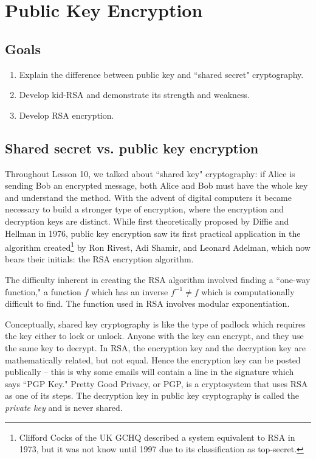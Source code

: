 \documentclass[m3380-lec-main.tex]{subfiles}
\begin{document}
\chapter{Public Key Encryption}

\section*{Goals}
\begin{enumerate}[1.~]\setlength{\itemsep}{0pt}
\item Explain the difference between public key and ``shared secret" cryptography.
\item Develop kid-RSA and demonstrate its strength and weakness.
\item Develop RSA encryption.
\end{enumerate}

\section{Shared secret vs. public key encryption}
Throughout Lesson 10, we talked about ``shared key" cryptography: if Alice is sending Bob an encrypted message, both Alice and Bob must have the whole key and understand the method. With the advent of digital computers it became necessary to build a stronger type of encryption, where the encryption and decryption keys are distinct. While first theoretically proposed by Diffie and Hellman in 1976, public key encryption saw its first practical application in the algorithm created\footnote{Clifford Cocks of the UK GCHQ described a system equivalent to RSA in 1973, but it was not know until 1997 due to its classification as top-secret.} by Ron Rivest, Adi Shamir, and Leonard Adelman, which now bears their initials: the RSA encryption algorithm.

The difficulty inherent in creating the RSA algorithm involved finding a ``one-way function," a function $f$ which has an inverse $f^{-1}\neq f$ which is computationally difficult to find. The function used in RSA involves modular exponentiation.

Conceptually, shared key cryptography is like the type of padlock which requires the key either to lock or unlock. Anyone with the key can encrypt, and they use the same key to decrypt. In RSA, the encryption key and the decryption key are mathematically related, but not equal. Hence the encryption key can be posted publically -- this is why some emails will contain a line in the signature which says ``PGP Key." Pretty Good Privacy, or PGP, is a cryptosystem that uses RSA as one of its steps. The decryption key in public key cryptography is called the \emph{private key} and is never shared. 
\end{document}
